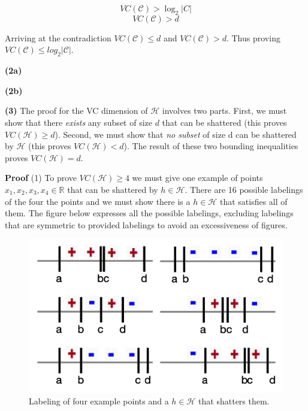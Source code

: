 \documentclass[11pt]{article}
\renewcommand\part[1]{\vspace{.10in}\textbf{(#1)}}
\begin{document}
$$VC(\mathcal{C}) > \log_2|C|$$
$$VC(\mathcal{C}) > d$$

Arriving at the contradiction $VC(\mathcal{C}) \leq d$ and $VC(\mathcal{C}) > d$. Thus proving $VC(\mathcal{C}) \leq log_2|\mathcal{C}|$.

\part{2a}

\part{2b}

\part{3} The proof for the VC dimension of $\mathcal{H}$ involves two parts. First, we must show that there \textit{exists} any subset of size $d$ that can be shattered (this proves $VC(\mathcal{H}) \geq d$). Second, we must show that \textit{no subset} of size d can be shattered by $\mathcal{H}$ (this proves $VC(\mathcal{H}) < d$). The result of these two bounding inequalities proves $VC(\mathcal{H}) = d$.

\textbf{Proof} (1) To prove $VC(\mathcal{H}) \geq 4$ we must give one example of points $x_1, x_2, x_3, x_4 \in \mathbb{R}$ that can be shattered by $h \in \mathcal{H}$. There are 16 possible labelings of the four the points and we must show there is a $h \in \mathcal{H}$ that satisfies all of them. The figure below expresses all the possible labelings, excluding labelings that are symmetric to provided labelings to avoid an excessiveness of figures.

\begin{figure}[H]
  \centerline{\includegraphics[width=0.8\linewidth]{image_2_3_1.png}}
  \caption{Labeling of four example points and a $h \in \mathcal{H}$ that shatters them.}
\end{figure}
\end{document}
